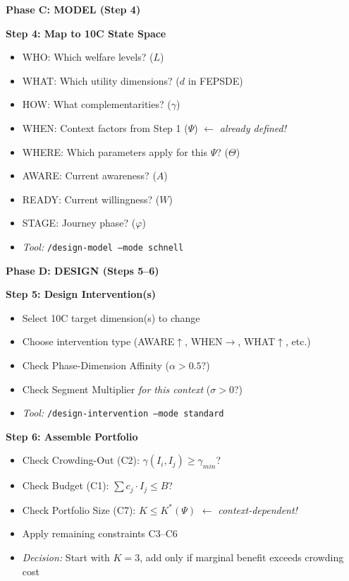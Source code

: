 \begin{tcolorbox}[colback=blue!5!white,colframe=blue!75!black,
    title=\textbf{7-Step Workflow: Context $\to$ Model $\to$ Portfolio $\to$ Learn}]
\vspace{1em}
\textbf{Phase C: MODEL (Step 4)}

\textbf{Step 4: Map to 10C State Space}
\begin{itemize}[noitemsep]
    \item WHO: Which welfare levels? ($L$)
    \item WHAT: Which utility dimensions? ($d$ in FEPSDE)
    \item HOW: What complementarities? ($\gamma$)
    \item WHEN: Context factors from Step 1 ($\Psi$) $\leftarrow$ \textit{already defined!}
    \item WHERE: Which parameters apply for this $\Psi$? ($\Theta$)
    \item AWARE: Current awareness? ($A$)
    \item READY: Current willingness? ($W$)
    \item STAGE: Journey phase? ($\varphi$)
    \item \textit{Tool:} \texttt{/design-model --mode schnell}
\end{itemize}

\vspace{1em}
\textbf{Phase D: DESIGN (Steps 5--6)}

\textbf{Step 5: Design Intervention(s)}
\begin{itemize}[noitemsep]
    \item Select 10C target dimension(s) to change
    \item Choose intervention type (AWARE$\uparrow$, WHEN$\to$, WHAT$\uparrow$, etc.)
    \item Check Phase-Dimension Affinity ($\alpha > 0.5$?)
    \item Check Segment Multiplier \textit{for this context} ($\sigma > 0$?)
    \item \textit{Tool:} \texttt{/design-intervention --mode standard}
\end{itemize}

\textbf{Step 6: Assemble Portfolio}
\begin{itemize}[noitemsep]
    \item Check Crowding-Out (C2): $\gamma(I_i, I_j) \geq \gamma_{min}$?
    \item Check Budget (C1): $\sum c_j \cdot I_j \leq B$?
    \item Check Portfolio Size (C7): $K \leq K^*(\Psi)$ $\leftarrow$ \textit{context-dependent!}
    \item Apply remaining constraints C3--C6
    \item \textit{Decision:} Start with $K=3$, add only if marginal benefit exceeds crowding cost
\end{itemize}


\end{tcolorbox}
